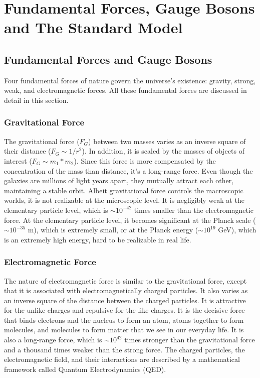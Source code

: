 \section{Fundamental Forces, Gauge Bosons and The Standard Model}
\subsection{Fundamental Forces and Gauge Bosons}
Four fundamental forces of nature govern the universe's existence: gravity, strong, weak, and electromagnetic forces. All these fundamental forces are discussed in detail in this section. 
\subsubsection{Gravitational Force}
The gravitational force ($F_G$) between two masses varies as an inverse square of their distance ($F_G \sim 1/r^2$). In addition, it is scaled by the masses of objects of interest ($F_G \sim m_1*m_2$). Since this force is more compensated by the concentration of the mass than distance, it's a long-range force. Even though the galaxies are millions of light years apart, they mutually attract each other, maintaining a stable orbit. Albeit gravitational force controls the macroscopic worlds, it is not realizable at the microscopic level. It is negligibly weak at the elementary particle level, which is $\sim 10^{-42}$ times smaller than the electromagnetic force. At the elementary particle level, it becomes significant at the Planck scale ($\sim 10^{-35}$ m), which is extremely small, or at the Planck energy ($\sim 10^{19}$ GeV), which is an extremely high energy, hard to be realizable in real life.       
\subsubsection{Electromagnetic Force}
The nature of electromagnetic force is similar to the gravitational force, except that it is associated with electromagnetically charged particles. It also varies as an inverse square of the distance between the charged particles. It is attractive for the unlike charges and repulsive for the like charges. It is the decisive force that binds electrons and the nucleus to form an atom, atoms together to form molecules, and molecules to form matter that we see in our everyday life. It is also a long-range force, which is $\sim 10^{42}$ times stronger than the gravitational force and a thousand times weaker than the strong force. The charged particles, the electromagnetic field, and their interactions are described by a mathematical framework called Quantum Electrodynamics (QED).   

